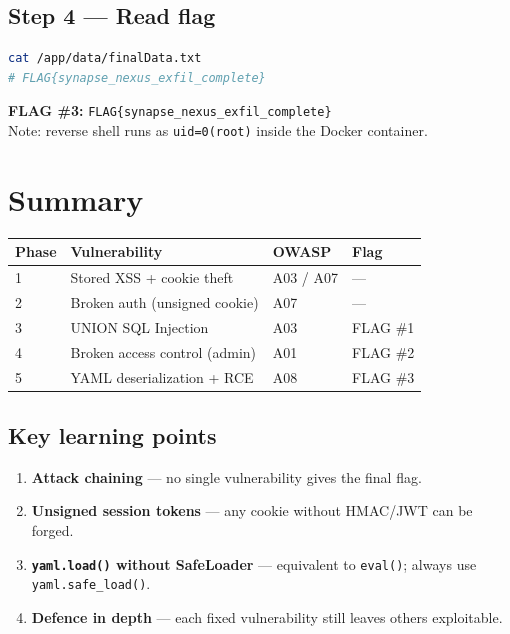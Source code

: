 \documentclass[a4paper, 12pt]{article}
\begin{document}
\subsection*{Step 4 --- Read flag}
\begin{lstlisting}[language=bash]
cat /app/data/finalData.txt
# FLAG{synapse_nexus_exfil_complete}
\end{lstlisting}

\begin{mdframed}[backgroundcolor=labgray, linecolor=flagcolor, linewidth=1pt]
\textbf{\color{flagcolor}FLAG \#3:} \texttt{FLAG\{synapse\_nexus\_exfil\_complete\}}\\
Note: reverse shell runs as \texttt{uid=0(root)} inside the Docker container.
\end{mdframed}

\section{Summary}

\begin{table}[H]
\centering
\begin{tabularx}{\textwidth}{llXl}
\toprule
\textbf{Phase} & \textbf{Vulnerability} & \textbf{OWASP} & \textbf{Flag} \\
\midrule
1 & Stored XSS + cookie theft     & A03 / A07 & --- \\
2 & Broken auth (unsigned cookie)  & A07       & --- \\
3 & UNION SQL Injection            & A03       & FLAG \#1 \\
4 & Broken access control (admin)  & A01       & FLAG \#2 \\
5 & YAML deserialization + RCE     & A08       & FLAG \#3 \\
\bottomrule
\end{tabularx}
\end{table}

\subsection*{Key learning points}
\begin{enumerate}[leftmargin=2em]
  \item \textbf{Attack chaining} --- no single vulnerability gives the final flag.
  \item \textbf{Unsigned session tokens} --- any cookie without HMAC/JWT can be forged.
  \item \textbf{\texttt{yaml.load()} without SafeLoader} --- equivalent to \texttt{eval()};
        always use \texttt{yaml.safe\_load()}.
  \item \textbf{Defence in depth} --- each fixed vulnerability still leaves others exploitable.
\end{enumerate}
\end{document}
